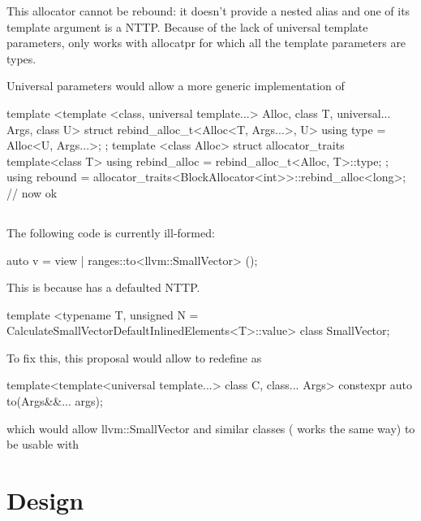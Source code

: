 \documentclass{wg21}
\begin{document}
This allocator cannot be rebound: it doesn't provide a  nested alias and one of its template argument is a NTTP.
Because of the lack of universal template parameters,  only works with allocatpr for which all the template parameters are types.

Universal parameters would allow a more generic implementation of 


\begin{colorblock}
template <template <class, universal template...> Alloc, class T, universal... Args, class U>
struct rebind_alloc_t<Alloc<T, Args...>, U> {
    using type = Alloc<U, Args...>;
};
template <class Alloc>
struct allocator_traits {
    template<class T>
    using rebind_alloc = rebind_alloc_t<Alloc, T>::type;
};
using rebound = allocator_traits<BlockAllocator<int>>::rebind_alloc<long>; // now ok
\end{colorblock}

\subsection{}

The following code is currently ill-formed:

\begin{colorblock}
auto v = view | ranges::to<llvm::SmallVector> ();
\end{colorblock}

This is because  has a defaulted NTTP.

\begin{colorblock}
template <typename T, unsigned N = CalculateSmallVectorDefaultInlinedElements<T>::value>
class SmallVector;
\end{colorblock}

To fix this, this proposal would allow to redefine  as

\begin{colorblock}
template<template<universal template...> class C, class... Args>
constexpr auto to(Args&&... args);
\end{colorblock}

which would allow llvm::SmallVector and similar classes ( works the same way)
to be usable with 

\section{Design}
\end{document}
